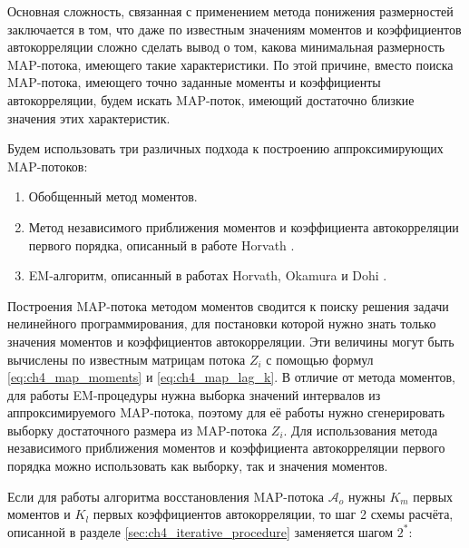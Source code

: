 Основная сложность, связанная с применением метода понижения размерностей заключается в том, что даже по известным значениям моментов и коэффициентов автокорреляции сложно сделать вывод о том, какова минимальная размерность MAP-потока, имеющего такие характеристики. По этой причине, вместо поиска MAP-потока, имеющего точно заданные моменты и коэффициенты автокорреляции, будем искать MAP-поток, имеющий достаточно близкие значения этих характеристик.

Будем использовать три различных подхода к построению аппроксимирующих MAP-потоков:

\begin{enumerate}
\item Обобщенный метод моментов.
\item Метод независимого приближения моментов и коэффициента автокорреляции первого порядка, описанный в работе Horvath \cite{Horvath2005}.
\item EM-алгоритм, описанный в работах Horvath, Okamura и Dohi \cite{Okamura2009,Horvath2013}.
\end{enumerate}

Построения MAP-потока методом моментов сводится к поиску решения задачи нелинейного программирования, для постановки которой нужно знать только значения моментов и коэффициентов автокорреляции. Эти величины могут быть вычислены по известным матрицам потока $Z_i$ с помощью формул \eqref{eq:ch4_map_moments} и \eqref{eq:ch4_map_lag_k}. В отличие от метода моментов, для работы EM-процедуры нужна выборка значений интервалов из аппроксимируемого MAP-потока, поэтому для её работы нужно сгенерировать выборку достаточного размера из MAP-потока $Z_i$. Для использования метода независимого приближения моментов и коэффициента автокорреляции первого порядка можно использовать как выборку, так и значения моментов.

Если для работы алгоритма восстановления MAP-потока $\mathcal{A}_o$ нужны $K_m$ первых моментов и $K_l$ первых коэффициентов автокорреляции, то шаг 2 схемы расчёта, описанной в разделе \ref{sec:ch4_iterative_procedure} заменяется шагом $2^*$:

